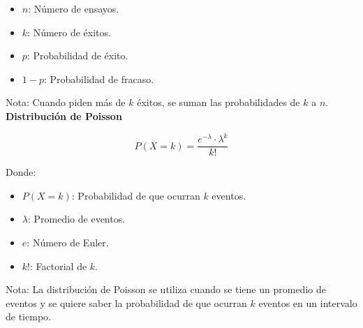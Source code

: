 \documentclass[11pt, a4paper]{article}
\newenvironment{distribucionBinomial}{}{}
\newenvironment{distribucionDePoisson}{}{}
\begin{document}
\begin{multicols}{2}
\begin{distribucionBinomial}
\begin{itemize}
                \item $n$: Número de ensayos.
                \item $k$: Número de éxitos.
                \item $p$: Probabilidad de éxito.
                \item $1-p$: Probabilidad de fracaso.
            \end{itemize}
            Nota:
            Cuando piden más de $k$ éxitos, se suman las probabilidades de $k$ a $n$.
        \end{distribucionBinomial}
        \begin{distribucionDePoisson}
            \textbf{Distribución de Poisson}
            \hrulefill
            \begin{center}
                \begin{equation*}
                    P(X = k) = \dfrac{e^{-\lambda} \cdot \lambda^k}{k!}
                \end{equation*}
            \end{center}
            Donde:
            \begin{itemize}
                \item $P(X = k)$: Probabilidad de que ocurran $k$ eventos.
                \item $\lambda$: Promedio de eventos.
                \item $e$: Número de Euler.
                \item $k!$: Factorial de $k$.
            \end{itemize}
            Nota:
            La distribución de Poisson se utiliza cuando se tiene un promedio de eventos y se quiere saber la probabilidad de que ocurran $k$ eventos en un intervalo de tiempo.
        \end{distribucionDePoisson}
    \end{multicols}
\end{document}
